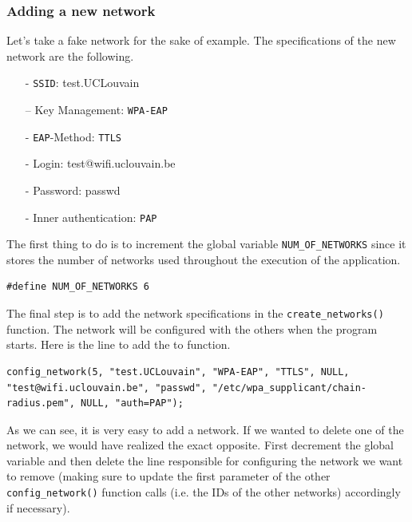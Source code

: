 \subsubsection*{Adding a new network}
Let's take a fake network for the sake of example. The specifications of the new network are the following.

\begin{itemize}
	\item [-] \texttt{SSID}: test.UCLouvain
	\item [–] Key Management: \texttt{WPA-EAP}
	\item [-] \texttt{EAP}-Method: \texttt{TTLS}
	\item [-] Login: test@wifi.uclouvain.be
	\item [-] Password: passwd
	\item [-] Inner authentication: \texttt{PAP}
\end{itemize}

The first thing to do is to increment the global variable \texttt{NUM\_OF\_NETWORKS} since it stores the number of networks used throughout the execution of the application.\\

\begin{lstlisting}[frame=single,breaklines=true,caption={Small log file example}]
#define NUM_OF_NETWORKS 6
\end{lstlisting}

The final step is to add the network specifications in the \texttt{create\_networks()} function. The network will be configured with the others when the program starts. Here is the line to add the to function.\\

\begin{lstlisting}[frame=single,breaklines=true,caption={Small log file example}]
config_network(5, "test.UCLouvain", "WPA-EAP", "TTLS", NULL, "test@wifi.uclouvain.be", "passwd", "/etc/wpa_supplicant/chain-radius.pem", NULL, "auth=PAP");
\end{lstlisting}

As we can see, it is very easy to add a network. If we wanted to delete one of the network, we would have realized the exact opposite. First decrement the global variable and then delete the line responsible for configuring the network we want to remove (making sure to update the first parameter of the other \texttt{config\_network()} function calls (i.e. the IDs of the other networks) accordingly if necessary).

